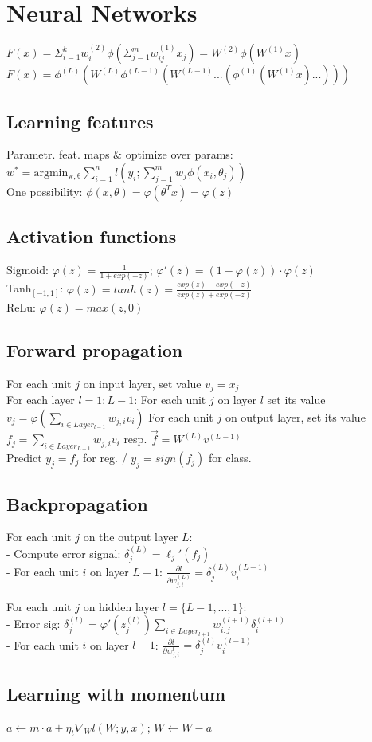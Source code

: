 \section*{Neural Networks}
$F(x)=\Sigma_{i=1}^kw_i^{(2)}\phi(\Sigma_{j=1}^mw_{ij}^{(1)}x_j)=W^{(2)}\phi(W^{(1)}x)$\\
$F(x)=\phi^{(L)}(W^{(L)}\phi^{(L-1)}(W^{(L-1)}...(\phi^{(1)}(W^{(1)}x)...)))$
\subsection*{Learning features}
Parametr. feat. maps \& optimize over params:\\
$w^* = \operatorname{argmin_{w, \theta}} \sum_{i=1}^n l(y_i; \sum_{j=1}^m w_j \phi(x_i, \theta_j))$\\
One possibility: $\phi(x,\theta) = \varphi(\theta^T x) = \varphi(z)$

\subsection*{Activation functions}
Sigmoid: $\varphi(z) = \frac{1}{1+exp(-z)}$;  $\varphi'(z) = (1 - \varphi(z))\cdot\varphi(z)$\\
Tanh$_{[-1,1]}$: $\varphi(z) = tanh(z) = \frac{exp(z)-exp(-z)}{exp(z)+exp(-z)}$\\
ReLu:  $\varphi(z) = max(z,0)$

\subsection*{Forward propagation}
For each unit $j$ on input layer, set value $v_j=x_j$\\
For each layer $l=1:L-1$: For each unit $j$ on layer $l$ set its value $v_j = \varphi(\sum_{i\in Layer_{l-1}} w_{j,i}v_i)$
For each unit $j$ on output layer, set its value $f_j = \sum_{i\in Layer_{L-1}} w_{j,i}v_i$ resp. $\vec{f}=W^{(L)}v^{(L-1)}$\\
Predict $y_j = f_j$ for reg. / $y_j = sign(f_j)$ for class.

\subsection*{Backpropagation}
For each unit $j$ on the output layer $L$:\\
- Compute error signal: $\delta_j^{(L)} = \ell_j'(f_j)$\\
- For each unit $i$ on layer $L-1$: $\frac{\partial l}{\partial w_{j,i}^{(L)}} = \delta_j^{(L)} v_i^{(L-1)}$

For each unit $j$ on hidden layer $l=\{L-1,...,1\}$:\\
- Error sig: $\delta_j^{(l)} = \varphi'(z_j^{(l)}) \sum_{i\in Layer_{l+1}} w_{i,j}^{(l+1)}\delta_i^{(l+1)}$\\
- For each unit $i$ on layer $l-1$: $\frac{\partial l}{\partial w_{j,i}^{l}} = \delta_j^{(l)} v_i^{(l-1)}$

\subsection*{Learning with momentum}
$a \leftarrow m \cdot a + \eta_t \nabla_W l(W;y,x)$; $W \leftarrow W - a$